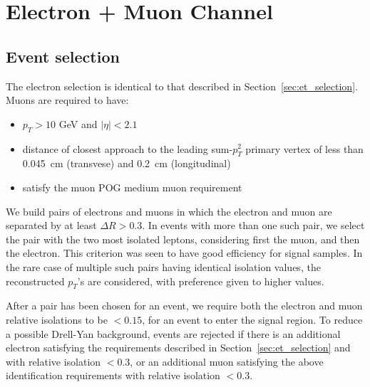 \section{Electron + Muon Channel}\label{sec:eMu}

\subsection{Event selection}\label{sec:em_selection}


The electron selection is identical to that described in
Section~\ref{sec:et_selection}.  Muons are required to have:
\begin{itemize}
  \item $p_{T} > 10$ GeV and $\vert \eta \vert < 2.1$
  \item distance of closest approach to the leading sum-$p_T^2$ 
    primary vertex of less than 0.045~cm (transvese) and 0.2~cm (longitudinal)
  \item satisfy the muon POG medium muon requirement
\end{itemize}

We build pairs of electrons and muons in which the electron and muon
are separated by at least $\Delta R > 0.3$.  In events with more than
one such pair, we select the pair with the two most isolated leptons,
considering first the muon, and then the electron.  This criterion was
seen to have good efficiency for signal samples.  In the rare case of
multiple such pairs having identical isolation values, the
reconstructed $p_T$'s are considered, with preference given to higher values.

After a pair has been chosen for an event, we require both the
electron and muon relative isolations to be $<0.15$, for an event to
enter the signal region.  To reduce a possible Drell-Yan background,
events are rejected if there is an additional electron satisfying the
requirements described in Section~\ref{sec:et_selection} and with
relative isolation $<0.3$, or an additional muon satisfying the above
identification requirements with relative isolation $<0.3$.

